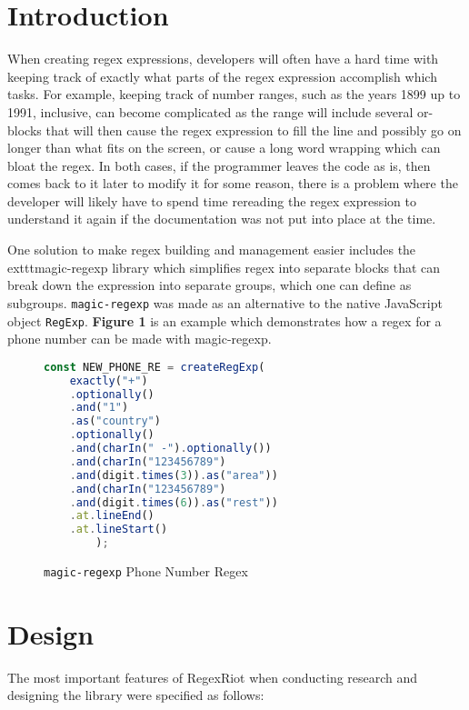 \documentclass[conference]{IEEEtran}
\begin{document}
\section{Introduction}
When creating regex expressions, developers will often have a hard time with keeping track of exactly
what parts of the regex expression accomplish which tasks. For example, keeping track of number ranges,
such as the years 1899 up to 1991, inclusive, can become complicated as the range will include several or-blocks that
will then cause the regex expression to fill the line and possibly go on longer than what fits on the screen,
or cause a long word wrapping which can bloat the regex.
In both cases, if the programmer leaves the code as is, then comes back to it later to modify it for some reason,
there is a problem where the developer will likely have to spend time rereading the regex expression to understand
it again if the documentation was not put into place at the time.

One solution to make regex building and management easier includes the 	exttt{magic-regexp} library
which simplifies regex into separate blocks that can break down the expression into separate
groups, which one can define as subgroups.
\texttt{magic-regexp} was made as an alternative to the native JavaScript object \texttt{RegExp}.
\textbf{Figure 1} is an example which demonstrates how a regex for a phone number can be made with
magic-regexp.

\vfill\eject

\begin{figure}[htbp]
    \centering
    \label{fig:magic-regexp-phonenum-regex}
    \begin{lstlisting}[language=JavaScript]
const NEW_PHONE_RE = createRegExp(
    exactly("+")
    .optionally()
    .and("1")
    .as("country")
    .optionally()
    .and(charIn(" -").optionally())
    .and(charIn("123456789")
    .and(digit.times(3)).as("area"))
    .and(charIn("123456789")
    .and(digit.times(6)).as("rest"))
    .at.lineEnd()
    .at.lineStart()
        );
    \end{lstlisting}
    \caption{\texttt{magic-regexp} Phone Number Regex}
\end{figure}

\section{Design}

The most important features of RegexRiot when conducting research and designing the library were specified as follows:
\end{document}
